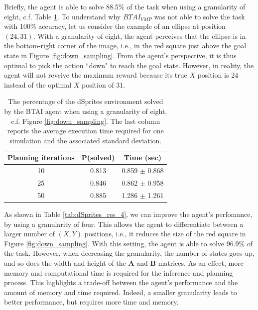 \documentclass[twoside,11pt]{article}
\begin{document}
Briefly, the agent is able to solve 88.5\% of the task when using a granularity of eight, c.f. Table \ref{tab:dSprites_res_8}. To understand why $BTAI_{VMP}$ was not able to solve the task with 100\% accuracy, let us consider the example of an ellipse at position $(24,31)$. With a granularity of eight, the agent perceives that the ellipse is in the bottom-right corner of the image, i.e., in the red square just above the goal state in Figure \ref{fig:down_sampling}. From the agent's perspective, it is thus optimal to pick the action ``down" to reach the goal state. However, in reality, the agent will not reveive the maximum reward because its true $X$ position is $24$ instead of the optimal $X$ position of $31$. 

\begin{table}[H]
\centering
\begin{tabular}{ |c|c|c| }
 \hline
 Planning iterations & P(solved) & Time (sec) \\
 \hline
 10 & 0.813	 & 0.859 $\pm$ 0.868 \\
 \hline
 25 & 0.846 & 0.862 $\pm$ 0.958 \\
 \hline
 50 & 0.885 & 1.286 $\pm$ 1.261 \\
 \hline
\end{tabular}
\caption{The percentage of the dSprites environment solved by the BTAI agent when using a granularity of eight, c.f. Figure \ref{fig:down_sampling}. The last column reports the average execution time required for one simulation and the associated standard deviation.}
\label{tab:dSprites_res_8}
\end{table}

As shown in Table \ref{tab:dSprites_res_4}, we can improve the agent's perfomance, by using a granularity of four. This allows the agent to differentiate between a larger number of $(X,Y)$ positions, i.e., it reduces the size of the red square in Figure \ref{fig:down_sampling}. With this setting, the agent is able to solve 96.9\% of the task. However, when decreasing the granularity, the number of states goes up, and so does the width and height of the $\bm{A}$ and $\bm{B}$ matrices. As an effect, more memory and computational time is required for the inference and planning process. This highlights a trade-off between the agent's performance and the amount of memory and time required. Indeed, a smaller granularity leads to better performance, but requires more time and memory.
\end{document}
